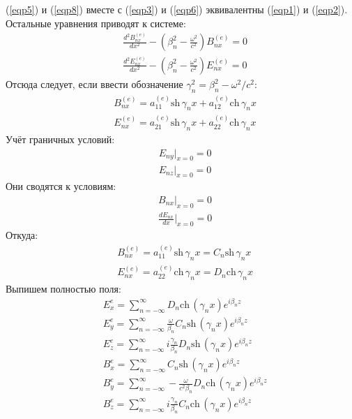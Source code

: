 \documentclass[a4paper,12pt]{extarticle} %
\newcommand{\Dff}[2]{\frac{d #1}{d #2}}
\newcommand{\Dfs}[2]{\frac{d^2 #1}{d #2^2}}
\renewcommand{\cosh}{\mathrm{ch}\,}
\renewcommand{\sinh}{\mathrm{sh}\,}
\begin{document}
(\ref{eqp5}) и (\ref{eqp8}) вместе с (\ref{eqp3}) и (\ref{eqp6}) эквивалентны (\ref{eqp1}) и (\ref{eqp2}). Остальные уравнения приводят к системе:
\begin{align*}
& \Dfs{B^{(e)}_{nx}}{x} - \left(\beta_n^2 - \frac{\omega^2}{c^2}\right) B^{(e)}_{nx}  =  0 \\
& \Dfs{E^{(e)}_{nx}}{x} - \left(\beta_n^2 - \frac{\omega^2}{c^2}\right) E^{(e)}_{nx}  =  0
\end{align*} 
Отсюда следует, если ввести обозначение $\gamma_n^2 = \beta_n^2 - {\omega^2}/{c^2}$:
\begin{equation*}
	\begin{aligned}
		& B_{nx}^{(e)} = a_{11}^{(e)} \sinh \gamma_n x + a_{12}^{(e)} \cosh \gamma_n x \\ 
		& E_{nx}^{(e)} = a_{21}^{(e)} \sinh \gamma_n x + a_{22}^{(e)} \cosh \gamma_n x
	\end{aligned}
\end{equation*}
Учёт граничных условий:
\begin{align*}
	& E_{ny}\Bigg|_{x = 0} = 0 \\
	& E_{nz}\Bigg|_{x = 0} = 0
\end{align*}
Они сводятся к условиям:
\begin{align*}
& B_{nx}\Bigg|_{x = 0} = 0 \\
& \Dff{E_{nx}}{x}\Bigg|_{x = 0} = 0
\end{align*}
Откуда:
\begin{equation*}
	\begin{aligned}
		& B_{nx}^{(e)} = a_{11}^{(e)} \sinh \gamma_n x = C_n \sinh \gamma_n x\\ 
		& E_{nx}^{(e)} = a_{22}^{(e)} \cosh \gamma_n x = D_n \cosh \gamma_n x
	\end{aligned}
\end{equation*}
Выпишем полностью поля:
\begin{align*}
	& E_{x}^{e} = \sum_{n = -\infty}^{\infty} D_n \cosh (\gamma_n x) e^{i\beta_n z} \\
	& E_{y}^{e} = \sum_{n = -\infty}^{\infty} \frac{\omega}{\beta_n} C_n \sinh (\gamma_n x) e^{i\beta_n z} \\
	& E_{z}^{e} = \sum_{n = -\infty}^{\infty} i \frac{\gamma_n}{\beta_n} D_n \sinh (\gamma_n x) e^{i\beta_n z} \\
	& B_{x}^{e} = \sum_{n = -\infty}^{\infty} C_n \sinh (\gamma_n x) e^{i\beta_n z} \\
	& B_{y}^{e} = \sum_{n = -\infty}^{\infty} - \frac{\omega}{c^2\beta_n} D_n \cosh (\gamma_n x) e^{i\beta_n z} \\
	& B_{z}^{e} = \sum_{n = -\infty}^{\infty} i\frac{\gamma_n}{\beta_n} C_n \cosh (\gamma_n x) e^{i\beta_n z}
\end{align*}
\end{document}
